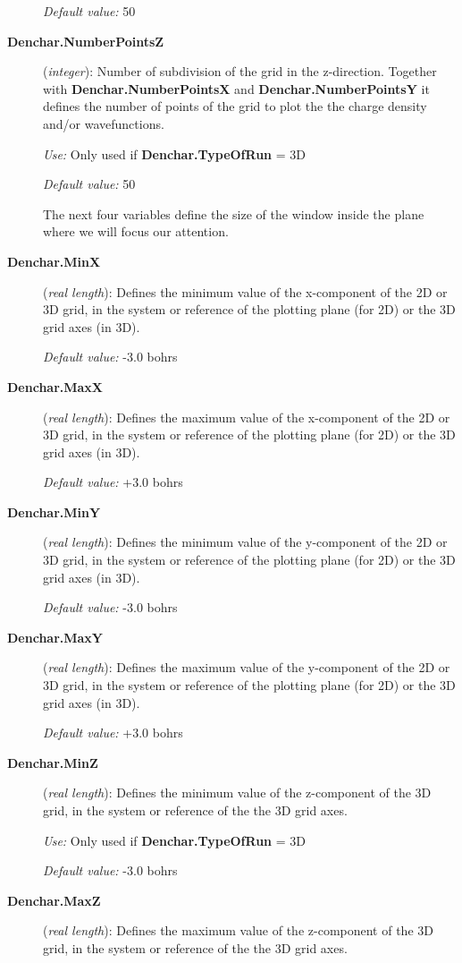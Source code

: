 \begin{description}
{\it Default value:} 50

\item[{\bf Denchar.NumberPointsZ}] ({\it integer}):
 Number of subdivision of the grid in the z-direction. Together
 with {\bf Denchar.NumberPointsX} and {\bf Denchar.NumberPointsY}
 it defines the 
 number of points of the grid to plot the the charge density
 and/or wavefunctions.

{\it Use:} Only used if {\bf Denchar.TypeOfRun} = 3D

{\it Default value:} 50


\noindent 
 The next four variables define the size of the window inside the plane where
 we will focus our attention.

\item[{\bf Denchar.MinX}] ({\it real length}):
 Defines the minimum value of the x-component of the 2D or 3D grid,
 in the system or reference of the plotting plane (for 2D)
 or the 3D grid axes  (in 3D).

{\it Default value:} -3.0 bohrs

\item[{\bf Denchar.MaxX}] ({\it real length}):
 Defines the maximum value of the x-component of the 2D or 3D grid,
 in the system or reference of the plotting plane (for 2D)
 or the 3D grid axes  (in 3D).

{\it Default value:} +3.0 bohrs

\item[{\bf Denchar.MinY}] ({\it real length}):
 Defines the minimum value of the y-component of the 2D or 3D grid,
 in the system or reference of the plotting plane (for 2D)
 or the 3D grid axes  (in 3D).

{\it Default value:} -3.0 bohrs

\item[{\bf Denchar.MaxY}] ({\it real length}):
 Defines the maximum value of the y-component of the 2D or 3D grid,
 in the system or reference of the plotting plane (for 2D)
 or the 3D grid axes  (in 3D).

{\it Default value:} +3.0 bohrs

\item[{\bf Denchar.MinZ}] ({\it real length}):
 Defines the minimum value of the z-component of the 3D grid,
 in the system or reference of the 
 the 3D grid axes.

{\it Use:} Only used if {\bf Denchar.TypeOfRun} = 3D

{\it Default value:} -3.0 bohrs

\item[{\bf Denchar.MaxZ}] ({\it real length}):
 Defines the maximum value of the z-component of the 3D grid,
 in the system or reference of the 
 the 3D grid axes.


\end{description}
